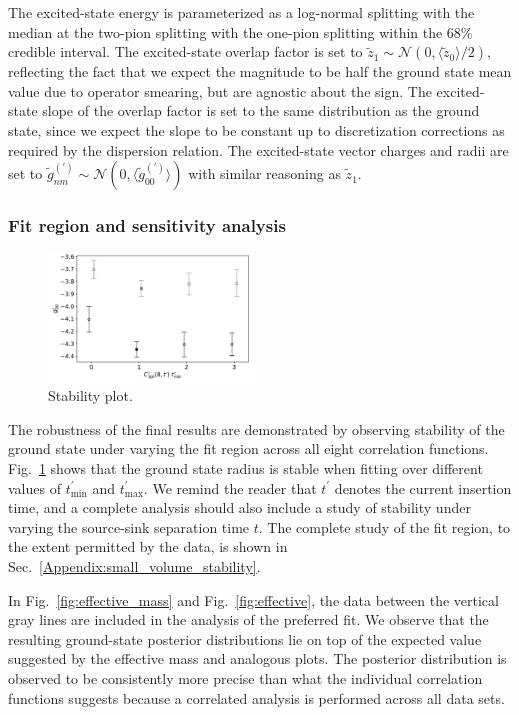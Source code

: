 \documentclass[prd,aps,twocolumn,superscriptaddress,tightenlines,nofootinbib,floatfix,preprintnumbers,10pt]{revtex4-1}
\begin{document}
The excited-state energy is parameterized as a log-normal splitting with the median at the two-pion splitting with the one-pion splitting within the 68\% credible interval. The excited-state overlap factor is set to $\tilde{z}_1\sim \mathcal{N}(0,\langle \tilde{z}_0\rangle/2)$, reflecting the fact that we expect the magnitude to be half the ground state mean value due to operator smearing, but are agnostic about the sign. The excited-state slope of the overlap factor is set to the same distribution as the ground state, since we expect the slope to be constant up to discretization corrections as required by the dispersion relation. The excited-state vector charges and radii are set to $\tilde{g}^{(\prime)}_{nm}\sim \mathcal{N}(0,\langle \tilde{g}^{(\prime)}_{00}\rangle)$ with similar reasoning as $\tilde{z}_1$. 

\subsubsection{Fit region and sensitivity analysis}

\begin{figure}[b]{
		\includegraphics[width=0.49\textwidth]{figures/3296_dgV8_dgV.pdf}
		\caption{Stability plot.}
		\label{fig:stability_main}
}\end{figure}

The robustness of the final results are demonstrated by observing stability of the ground state under varying the fit region across all eight correlation functions. Fig.~\ref{fig:stability_main} shows that the ground state radius is stable when fitting over different values of $t^\prime_{\mathrm{min}}$ and $t^\prime_{\mathrm{max}}$. We remind the reader that $t^\prime$ denotes the current insertion time, and a complete analysis should also include a study of stability under varying the source-sink separation time $t$. The complete study of the fit region, to the extent permitted by the data, is shown in Sec.~\ref{Appendix:small_volume_stability}.

In Fig.~\ref{fig:effective_mass} and Fig.~\ref{fig:effective}, the data between the vertical gray lines are included in the analysis of the preferred fit. We observe that the resulting ground-state posterior distributions lie on top of the expected value suggested by the effective mass and analogous plots. The posterior distribution is observed to be consistently more precise than what the individual correlation functions suggests because a correlated analysis is performed across all data sets.
\end{document}
